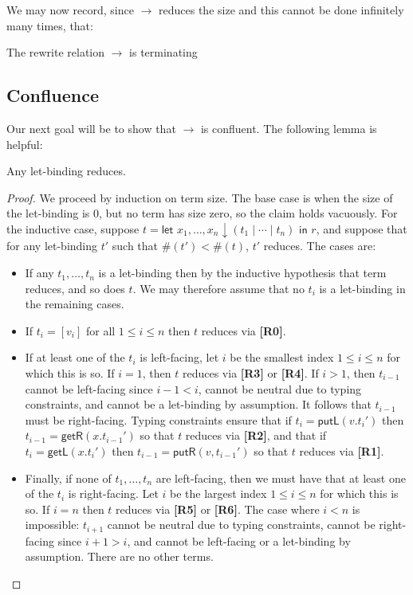 \documentclass[twoside,11pt,final]{entics}
\newcommand{\getl}{\mathsf{getL}}
\newcommand{\putr}{\mathsf{putR}}
\newcommand{\getr}{\mathsf{getR}}
\newcommand{\putl}{\mathsf{putL}}
\newcommand{\asn}{\downarrow}
\newcommand{\seq}{,\!\ldots\!,}
\begin{document}
We may now record, since $\to$ reduces the size and this cannot be done infinitely many times, that:
\begin{corollary}\label{lem:termination}
  The rewrite relation $\to$ is terminating
\end{corollary}

\subsection{Confluence}

Our next goal will be to show that $\to$ is confluent. The following lemma is helpful:
\begin{lemma}\label{lem:let-reduce}
  Any let-binding reduces.
\end{lemma}
\begin{proof} 
  We proceed by induction on term size. The base case is when the size of the let-binding is $0$, but no term has size zero, so the claim holds vacuously. For the inductive case, suppose $t = \textsf{let } x_1 \seq x_n \asn (t_1 \mid \cdots \mid t_n) \textsf{ in } r$, and suppose that for any let-binding $t'$ such that $\#(t') < \#(t)$, $t'$ reduces. The cases are:
  \begin{itemize}
  \item If any $t_1 \seq t_n$ is a let-binding then by the inductive hypothesis that term reduces, and so does $t$. We may therefore assume that no $t_i$ is a let-binding in the remaining cases.
  \item If $t_i = [v_i]$ for all $1 \leq i \leq n$ then $t$ reduces via \textbf{[R0]}.
  \item If at least one of the $t_i$ is left-facing, let $i$ be the smallest index $1 \leq i \leq n$ for which this is so. If $i = 1$, then $t$ reduces via \textbf{[R3]} or \textbf{[R4]}. If $i > 1$, then $t_{i-1}$ cannot be left-facing since $i - 1 < i$, cannot be neutral due to typing constraints, and cannot be a let-binding by assumption. It follows that $t_{i-1}$ must be right-facing. Typing constraints ensure that if $t_i = \putl(v.t_i')$ then $t_{i-1} = \getr(x.t_{i-1}')$ so that $t$ reduces via \textbf{[R2]}, and that if $t_i = \getl(x.t_i')$ then $t_{i-1} = \putr(v,t_{i-1}')$ so that $t$ reduces via \textbf{[R1]}.
  \item Finally, if none of $t_1 \seq t_n$ are left-facing, then we must have that at least one of the $t_i$ is right-facing. Let $i$ be the largest index $1 \leq i \leq n$ for which this is so. If $i = n$ then $t$ reduces via \textbf{[R5]} or \textbf{[R6]}. The case where $i < n$ is impossible: $t_{i+1}$ cannot be neutral due to typing constraints, cannot be right-facing since $i+1 > i$, and cannot be left-facing or a let-binding by assumption. There are no other terms. 
  \end{itemize}
\end{proof}
\end{document}
